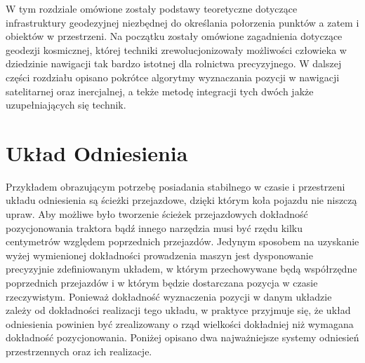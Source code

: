 ﻿W tym rozdziale omówione zostały podstawy teoretyczne dotyczące infrastruktury geodezyjnej niezbędnej do określania
połorzenia punktów a zatem i obiektów w przestrzeni. Na początku zostały omówione zagadnienia dotyczące geodezji kosmicznej,
której techniki zrewolucjonizowały możliwości człowieka w dziedzinie nawigacji tak bardzo istotnej dla rolnictwa precyzyjnego.
W dalszej części rozdziału opisano pokrótce algorytmy wyznaczania pozycji w nawigacji satelitarnej oraz inercjalnej, a tekże metodę 
integracji tych dwóch jakże uzupełniających się technik. 

\section{Układ Odniesienia}
Przykładem obrazującym potrzebę posiadania stabilnego w czasie i przestrzeni układu odniesienia są ścieżki przejazdowe,
dzięki którym koła pojazdu nie niszczą upraw. Aby możliwe było tworzenie ścieżek przejazdowych dokładność pozycjonowania 
traktora bądź innego narzędzia musi być rzędu kilku centymetrów względem poprzednich przejazdów. Jedynym sposobem 
na uzyskanie wyżej wymienionej dokładności prowadzenia maszyn jest dysponowanie precyzyjnie zdefiniowanym 
układem, w którym przechowywane będą współrzędne poprzednich przejazdów i w którym będzie dostarczana pozycja w 
czasie rzeczywistym. Ponieważ dokładność wyznaczenia pozycji w danym układzie zależy od dokładności realizacji tego układu,
w praktyce przyjmuje się, że układ odniesienia powinien być zrealizowany o rząd wielkości dokładniej niż wymagana dokładność pozycjonowania. \cite[][strona 210]{ggos}
Poniżej opisano dwa najważniejsze systemy odniesień przestrzennych oraz ich realizacje.
